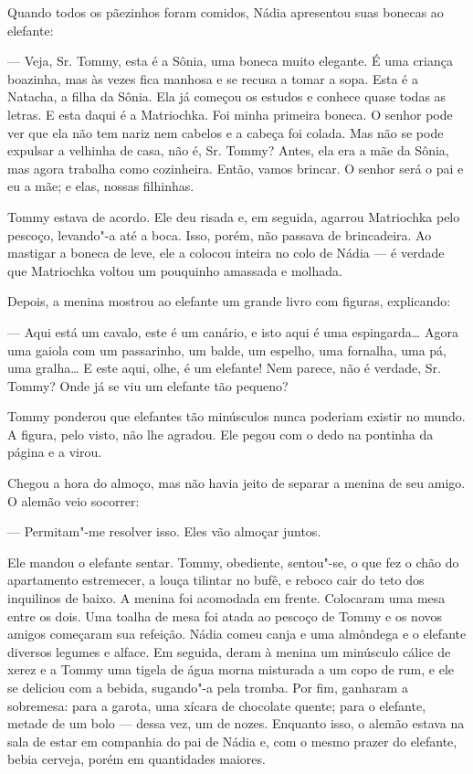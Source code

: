 Quando todos os pãezinhos foram comidos, Nádia apresentou suas bonecas
ao elefante:

--- Veja, Sr. Tommy, esta é a Sônia, uma boneca mui­to elegante. É uma
criança boazinha, mas às vezes fica manhosa e se recusa a tomar a sopa.
Esta é a Natacha, a filha da Sônia. Ela já começou os estudos e conhece
quase todas as letras. E esta daqui é a Matriochka. Foi minha primeira
boneca. O senhor pode ver que ela não tem nariz nem cabelos e a cabeça
foi colada. Mas não se pode expulsar a velhinha de casa, não é, Sr.
Tommy? Antes, ela era a mãe da Sônia, mas agora trabalha como
cozinheira. Então, vamos brincar. O senhor será o pai e eu a mãe; e
elas, nossas filhinhas.

Tommy estava de acordo. Ele deu risada e, em seguida, agarrou Matriochka
pelo pescoço, levando"-a até a boca. Isso, porém, não passava de
brincadeira. Ao mastigar a boneca de leve, ele a colocou inteira no colo
de Nádia --- é verdade que Matriochka voltou um pouquinho amassada e
molhada.

Depois, a menina mostrou ao elefante um grande livro com figuras,
explicando:

--- Aqui está um cavalo, este é um canário, e isto aqui é uma
espingarda\ldots{} Agora uma gaiola com um passarinho, um balde, um espelho,
uma fornalha, uma pá, uma gralha\ldots{} E este aqui, olhe, é um elefante!
Nem parece, não é verdade, Sr. Tommy? Onde já se viu um elefante tão
pequeno?

Tommy ponderou que elefantes tão minúsculos nunca poderiam existir no
mundo. A figura, pelo visto, não lhe agradou. Ele pegou com o dedo na
pontinha da página e a virou.

Chegou a hora do almoço, mas não havia jeito de separar a menina de seu
amigo. O alemão veio socorrer:

--- Permitam"-me resolver isso. Eles vão almoçar juntos.

Ele mandou o elefante sentar. Tommy, obediente, sentou"-se, o que fez o
chão do apartamento estremecer, a louça tilintar no bufê, e reboco cair
do teto dos inquilinos de baixo. A menina foi acomodada em frente.
Colocaram uma mesa entre os dois. Uma toalha de mesa foi atada ao
pescoço de Tommy e os novos amigos começaram sua refeição. Nádia comeu
canja e uma almôndega e o elefante diversos legumes e alface. Em
seguida, deram à menina um minúsculo cálice de xerez e a Tommy uma
tigela de água morna misturada a um copo de rum, e ele se deliciou com a
bebida, sugando"-a pela tromba. Por fim, ganharam a sobremesa: para a
ga­rota, uma xícara de chocolate quente; para o elefante, metade de um
bolo --- dessa vez, um de nozes. Enquanto isso, o alemão estava na sala
de estar em companhia do pai de Nádia e, com o mesmo prazer do elefante,
bebia cerveja, porém em quantidades maiores.

